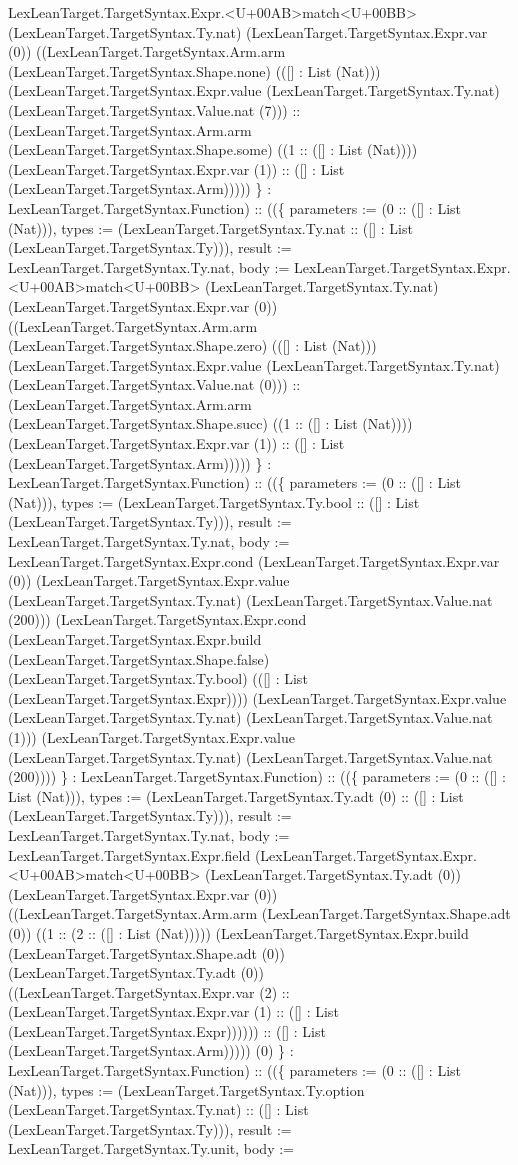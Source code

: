 \documentclass[11pt]{article}
\begin{document}
LexLeanTarget.TargetSyntax.Expr.<U+00AB>match<U+00BB> (LexLeanTarget.TargetSyntax.Ty.nat) (LexLeanTarget.TargetSyntax.Expr.var (0)) ((LexLeanTarget.TargetSyntax.Arm.arm (LexLeanTarget.TargetSyntax.Shape.none) (([] : List (Nat))) (LexLeanTarget.TargetSyntax.Expr.value (LexLeanTarget.TargetSyntax.Ty.nat) (LexLeanTarget.TargetSyntax.Value.nat (7))) :: (LexLeanTarget.TargetSyntax.Arm.arm (LexLeanTarget.TargetSyntax.Shape.some) ((1 :: ([] : List (Nat)))) (LexLeanTarget.TargetSyntax.Expr.var (1)) :: ([] : List (LexLeanTarget.TargetSyntax.Arm))))) \} : LexLeanTarget.TargetSyntax.Function) :: ((\{ parameters := (0 :: ([] : List (Nat))), types := (LexLeanTarget.TargetSyntax.Ty.nat :: ([] : List (LexLeanTarget.TargetSyntax.Ty))), result := LexLeanTarget.TargetSyntax.Ty.nat, body := LexLeanTarget.TargetSyntax.Expr.<U+00AB>match<U+00BB> (LexLeanTarget.TargetSyntax.Ty.nat) (LexLeanTarget.TargetSyntax.Expr.var (0)) ((LexLeanTarget.TargetSyntax.Arm.arm (LexLeanTarget.TargetSyntax.Shape.zero) (([] : List (Nat))) (LexLeanTarget.TargetSyntax.Expr.value (LexLeanTarget.TargetSyntax.Ty.nat) (LexLeanTarget.TargetSyntax.Value.nat (0))) :: (LexLeanTarget.TargetSyntax.Arm.arm (LexLeanTarget.TargetSyntax.Shape.succ) ((1 :: ([] : List (Nat)))) (LexLeanTarget.TargetSyntax.Expr.var (1)) :: ([] : List (LexLeanTarget.TargetSyntax.Arm))))) \} : LexLeanTarget.TargetSyntax.Function) :: ((\{ parameters := (0 :: ([] : List (Nat))), types := (LexLeanTarget.TargetSyntax.Ty.bool :: ([] : List (LexLeanTarget.TargetSyntax.Ty))), result := LexLeanTarget.TargetSyntax.Ty.nat, body := LexLeanTarget.TargetSyntax.Expr.cond (LexLeanTarget.TargetSyntax.Expr.var (0)) (LexLeanTarget.TargetSyntax.Expr.value (LexLeanTarget.TargetSyntax.Ty.nat) (LexLeanTarget.TargetSyntax.Value.nat (200))) (LexLeanTarget.TargetSyntax.Expr.cond (LexLeanTarget.TargetSyntax.Expr.build (LexLeanTarget.TargetSyntax.Shape.false) (LexLeanTarget.TargetSyntax.Ty.bool) (([] : List (LexLeanTarget.TargetSyntax.Expr)))) (LexLeanTarget.TargetSyntax.Expr.value (LexLeanTarget.TargetSyntax.Ty.nat) (LexLeanTarget.TargetSyntax.Value.nat (1))) (LexLeanTarget.TargetSyntax.Expr.value (LexLeanTarget.TargetSyntax.Ty.nat) (LexLeanTarget.TargetSyntax.Value.nat (200)))) \} : LexLeanTarget.TargetSyntax.Function) :: ((\{ parameters := (0 :: ([] : List (Nat))), types := (LexLeanTarget.TargetSyntax.Ty.adt (0) :: ([] : List (LexLeanTarget.TargetSyntax.Ty))), result := LexLeanTarget.TargetSyntax.Ty.nat, body := LexLeanTarget.TargetSyntax.Expr.field (LexLeanTarget.TargetSyntax.Expr.<U+00AB>match<U+00BB> (LexLeanTarget.TargetSyntax.Ty.adt (0)) (LexLeanTarget.TargetSyntax.Expr.var (0)) ((LexLeanTarget.TargetSyntax.Arm.arm (LexLeanTarget.TargetSyntax.Shape.adt (0)) ((1 :: (2 :: ([] : List (Nat))))) (LexLeanTarget.TargetSyntax.Expr.build (LexLeanTarget.TargetSyntax.Shape.adt (0)) (LexLeanTarget.TargetSyntax.Ty.adt (0)) ((LexLeanTarget.TargetSyntax.Expr.var (2) :: (LexLeanTarget.TargetSyntax.Expr.var (1) :: ([] : List (LexLeanTarget.TargetSyntax.Expr)))))) :: ([] : List (LexLeanTarget.TargetSyntax.Arm))))) (0) \} : LexLeanTarget.TargetSyntax.Function) :: ((\{ parameters := (0 :: ([] : List (Nat))), types := (LexLeanTarget.TargetSyntax.Ty.option (LexLeanTarget.TargetSyntax.Ty.nat) :: ([] : List (LexLeanTarget.TargetSyntax.Ty))), result := LexLeanTarget.TargetSyntax.Ty.unit, body := 
\end{document}
